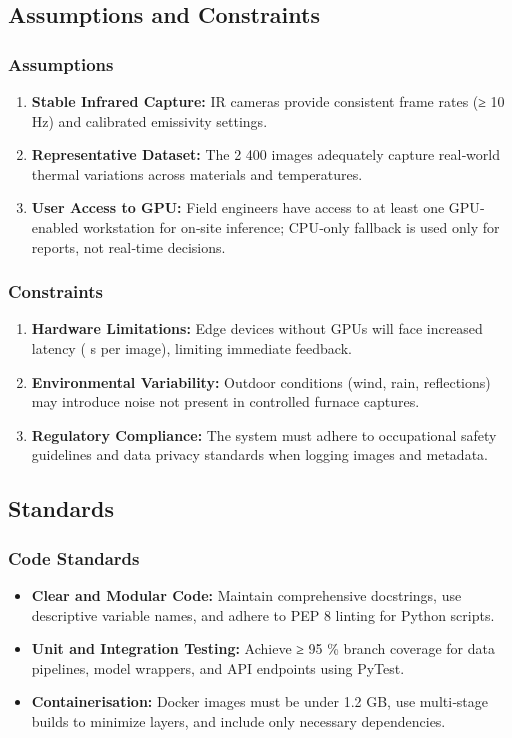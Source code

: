 \subsection{Assumptions and Constraints}

\subsubsection*{Assumptions}
\begin{enumerate}
    \item \textbf{Stable Infrared Capture:} IR cameras provide consistent frame rates (≥ 10 Hz) and calibrated emissivity settings.
    \item \textbf{Representative Dataset:} The 2 400 images adequately capture real‐world thermal variations across materials and temperatures.
    \item \textbf{User Access to GPU:} Field engineers have access to at least one GPU‐enabled workstation for on‐site inference; CPU‐only fallback is used only for reports, not real‐time decisions.
\end{enumerate}

\subsubsection*{Constraints}
\begin{enumerate}
    \item \textbf{Hardware Limitations:} Edge devices without GPUs will face increased latency ( s per image), limiting immediate feedback.
    \item \textbf{Environmental Variability:} Outdoor conditions (wind, rain, reflections) may introduce noise not present in controlled furnace captures.
    \item \textbf{Regulatory Compliance:} The system must adhere to occupational safety guidelines and data privacy standards when logging images and metadata.
\end{enumerate}

\subsection{Standards}

\subsubsection*{Code Standards}
\begin{itemize}
    \item \textbf{Clear and Modular Code:} Maintain comprehensive docstrings, use descriptive variable names, and adhere to PEP 8 linting for Python scripts.
    \item \textbf{Unit and Integration Testing:} Achieve ≥ 95 \% branch coverage for data pipelines, model wrappers, and API endpoints using PyTest.
    \item \textbf{Containerisation:} Docker images must be under 1.2 GB, use multi‐stage builds to minimize layers, and include only necessary dependencies.
\end{itemize}

